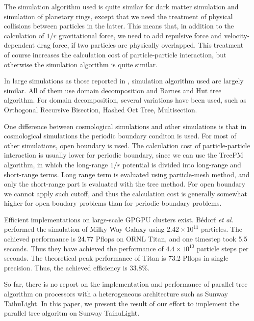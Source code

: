 \documentclass[sigconf]{acmart}
\begin{document}
The simulation algorithm used is quite similar for dark matter
simulation and simulation of planetary rings, except that we need the
treatment of physical collisions between particles in the latter. This
means that, in addition to the calculation of $1/r$ gravitational
force, we need to add repulsive force and velocity-dependent drag
force, if two particles are physically overlapped. This treatment of
course increases the calculation cost of particle-particle
interaction, but otherwise the simulation algorithm is quite similar.


In large simulations as those reported in \cite{Ishiyamaetal2012},
simulation algorithm used are largely similar. All of them use domain
decomposition and Barnes and Hut tree algorithm. For domain
decomposition, several variations have been used, such as
Orthogonal Recursive Bisection\cite{Salmon1990}, Hashed Oct
Tree\cite{WarrenSalmon1992}, Multisection\cite{Makino2004}.

One difference between cosmological simulations and other simulations
is that in cosmological simulations the periodic boundary conditon is
used. For most of other simulations, open boundary is used. The
calculation cost of particle-particle interaction is usually lower for
periodic boundary, since we can use the TreePM
algorithm\cite{Bagla2002}, in which the long-range $1/r$ potential is
divided into long-range and short-range terms. Long range term is
evaluated using particle-mesh method, and only the short-range part is
evaluated with the tree method. For open boundary we cannot apply such
cutoff, and thus the calculation cost is generally somewhat higher for
open boudary problems than for periodic boundary problems. 


Efficient implementations on large-scale GPGPU clusters
exist\cite{Hamadaetal2009, PortegiesZwartetal2014,Bedorfetal2014}.
B{\'e}dorf {\it et al.} performed the simulation of Milky Way Galaxy
  using $2.42 \times 10^{11}$ particles. The achieved performance is
  24.77 Pflops on ORNL Titan, and one timestep took 5.5 seconds. Thus
  they have achieved the performance of $4.4 \times 10^{10}$ particle
  steps per seconds. The theoretical peak performance of Titan is 73.2
  Pflops in single precision. Thus, the achieved efficiency is 33.8\%.

So far, there is no report on the implementation and performance of
parallel tree algorithm on processors with a heterogeneous
architecture such as Sunway TaihuLight.  In this paper, we present the
result of our effort to implement the parallel tree algoritm on Sunway
TaihuLight. 
\end{document}
